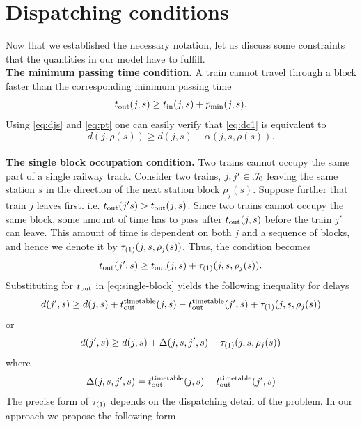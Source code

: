 \section{Dispatching conditions}
Now that we established the necessary notation, let us discuss some constraints that the quantities
in our model have to fulfill.\\
\textbf{The minimum passing time condition.} A train cannot travel through a block faster than the corresponding minimum passing time
\begin{equation}
    \label{eq:dc1}
t_\text{out}(j, s) \ge t_\text{in}(j, s) + p_\text{min}(j, s).
\end{equation}
Using \eqref{eq:djs} and \eqref{eq:pt} one can easily verify that \eqref{eq:dc1} is equivalent to
\begin{equation}
    d(j, \rho(s)) \ge d(j, s) - \alpha(j, s, \rho(s)).
\end{equation}\\
\textbf{The single block occupation condition.} Two trains cannot occupy the same part of a single
railway track. Consider two trains, $j, j' \in \mathcal{J}_0$ leaving the same station $s$ in the direction
of the next station block $\rho_j(s)$. Suppose further that train $j$ leaves first. i.e.
$t_\text{out}(j's) > t_\text{out}(j, s)$. Since two trains cannot occupy the same block, some amount of time has
to pass after $t_\text{out}(j, s)$ before the train $j'$ can leave. This amount of time is dependent on
both $j$ and a sequence of blocks, and hence we denote it by $\tau_{(1)}(j, s, \rho_j(s))$. Thus, the
condition becomes
\begin{equation}
\label{eq:single-block}
t_\text{out}(j', s) \ge t_\text{out}(j, s) + \tau_{(1)}(j, s, \rho_j(s)).
\end{equation}
Substituting for $t_\text{out}$ in \eqref{eq:single-block} yields the following inequality for delays
\begin{equation}
\label{eq:single-block-delays}
d(j', s) \ge d(j, s) + t_\text{out}^\text{timetable}(j, s) - t_\text{out}^\text{timetable}(j', s) + \tau_{(1)}(j, s, \rho_j(s))
\end{equation}
or
\begin{equation}
d(j', s) \ge d(j, s) + \Delta(j, s, j', s) + \tau_{(1)}(j, s, \rho_j(s))
\end{equation}
where
\begin{equation}
\label{eq:delta}
\Delta(j, s, j', s) = t_\text{out}^\text{timetable}(j, s) - t_\text{out}^\text{timetable}(j', s)
\end{equation}
The precise form of $\tau_{(1)}$ depends on the dispatching detail of the problem. In our approach we
propose the following form
